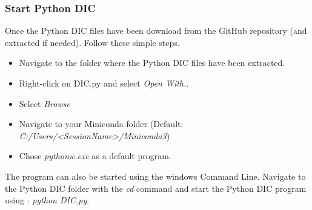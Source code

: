\subsubsection{Start Python DIC}
\label{subs:Start Python DIC}
  \indent\indent Once the Python DIC files have been download from the GitHub repository (and extracted if needed). Follow these simple steps.
  \begin{itemize}
    \item Navigate to the folder where the Python DIC files have been extracted.
    \item Right-click on DIC.py and select \textit{Open With..}
    \item Select \textit{Browse}
    \item Navigate to your Miniconda folder (Default: \textit{C:/Users/\textless SessionName\textgreater /Miniconda3})
    \item Chose \textit{pythonw.exe} as a default program.
  \end{itemize}
  \newline
  \indent\indent The program can also be started using the windows Command Line. Navigate to the Python DIC folder with the \textit{cd} command and start the Python DIC program using : \textit{python DIC.py}.\\
  \newline

